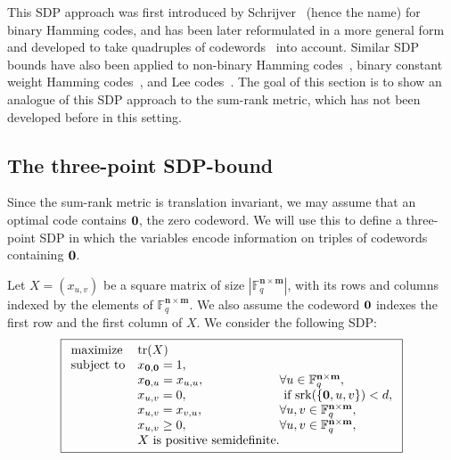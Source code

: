 \documentclass[a4paper]{article}
\newcommand{\F}{\mathbb{F}}
\newcommand{\bfn}{\mathbf {n}}
\newcommand{\bfm}{\mathbf {m}}
\newcommand{\spac}{\F^{\bfn\times\bfm}_q}
\newcommand{\srk}{\mathrm{srk}}
\DeclareMathOperator{\tr}{tr}
\begin{document}
This SDP approach was first introduced by Schrijver~\cite{S2005} (hence the name) for binary Hamming codes, and has been later reformulated in a more general form and developed to take quadruples of codewords~\cite{GMS2012} into account. Similar SDP bounds have also been applied to non-binary Hamming codes~\cite{LPS16,GST06}, binary constant weight Hamming codes~\cite{Polak19_B4}, and Lee codes~\cite{Polak19_Lee}. The goal of this section is to show an analogue of this SDP approach to the sum-rank metric, which has not been developed before in this setting.


\subsection{The three-point SDP-bound}\label{ssec:sdp.sdp}

Since the sum-rank metric is translation invariant, we may assume that an optimal code contains $\bf 0$, the zero codeword. We will use this to define a three-point SDP in which the variables encode information on triples of codewords containing $\bf 0$.

 
Let $X=(x_{u,v})$ be a square matrix of size $|\spac|$, with its rows and columns indexed by the elements of $\spac$. We also assume the codeword ${\bf 0}$ indexes the first row and the first column of $X$. We consider the following SDP:
\begin{equation}\label{eq:julia}
\boxed{
\begin{array}{ll@{}l}
\text{maximize}  &\tr(X) &\\
\text{subject to} &x_{{\bf 0},{\bf 0}}=1,~&\\
&x_{{\bf 0},u}=x_{u,u},~& \forall u\in\spac,\\
&x_{u,v}=0,~& \text{ if }\srk(\{{\bf 0},u,v\})<d,\\
&x_{u,v}=x_{v,u},~& \forall u,v\in\spac,\\
&x_{u,v}\geq0,~& \forall u,v\in\spac,\\
&X\text{ is positive semidefinite.}
\end{array}
}
\end{equation}
\end{document}
